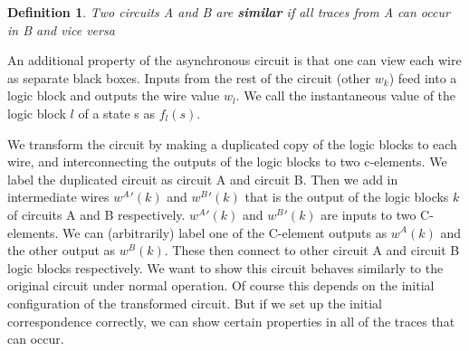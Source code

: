 \documentclass{article}
\newtheorem*{definition}{Definition}
\begin{document}
\begin{definition} Two circuits A and B are \textbf{similar} if all traces from A can occur in B and vice versa\end{definition}

An additional property of the asynchronous circuit is that one can view each wire as separate black boxes.  Inputs from the rest of the circuit (other $w_k$) feed into a logic block and outputs the wire value $w_l$.  We call the instantaneous value of the logic block $l$ of a state s as $f_l(s)$.
\newline

We transform the circuit by making a duplicated copy of the logic blocks to each wire, and interconnecting the outputs of the logic blocks to two c-elements.  We label the duplicated circuit as circuit A and circuit B.  Then we add in intermediate wires $w^A'(k)$ and $w^B'(k)$ that is the output
of the logic blocks $k$ of circuits A and B respectively.  $w^A'(k)$ and $w^B'(k)$ are inputs to two C-elements.  We can (arbitrarily) label one of the C-element outputs as $w^A(k)$ and the other output as $w^B(k)$.  These then connect to other circuit A and circuit B logic blocks respectively.
We want to show this circuit behaves similarly to the original circuit under normal operation.  %
Of course this depends on the initial configuration of the transformed circuit.  But if we set up the initial correspondence correctly, we can show certain properties in all of the traces that can occur.  
\newline
\end{document}
